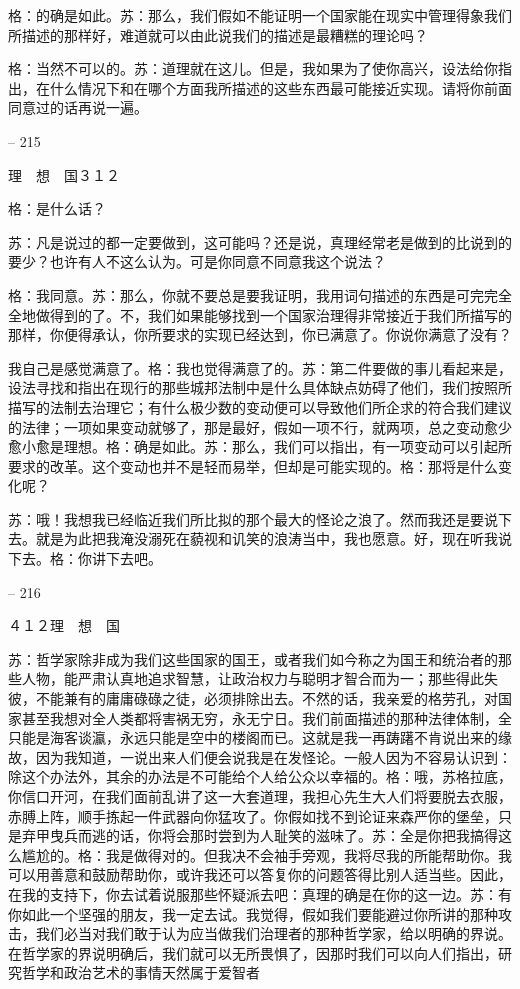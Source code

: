 \documentclass[11pt,oneside]{book}
\begin{document}
\begin{common-format}
    格：的确是如此。苏：那么，我们假如不能证明一个国家能在现实中管理得象我们所描述的那样好，难道就可以由此说我们的描述是最糟糕的理论吗？

    格：当然不可以的。苏：道理就在这儿。但是，我如果为了使你高兴，设法给你指出，在什么情况下和在哪个方面我所描述的这些东西最可能接近实现。请将你前面同意过的话再说一遍。

    

-- 215

    理　想　国３１２

    格：是什么话？

    苏：凡是说过的都一定要做到，这可能吗？还是说，真理经常老是做到的比说到的要少？也许有人不这么认为。可是你同意不同意我这个说法？

    格：我同意。苏：那么，你就不要总是要我证明，我用词句描述的东西是可完完全全地做得到的了。不，我们如果能够找到一个国家治理得非常接近于我们所描写的那样，你便得承认，你所要求的实现已经达到，你已满意了。你说你满意了没有？

    我自己是感觉满意了。格：我也觉得满意了的。苏：第二件要做的事儿看起来是，设法寻找和指出在现行的那些城邦法制中是什么具体缺点妨碍了他们，我们按照所描写的法制去治理它；有什么极少数的变动便可以导致他们所企求的符合我们建议的法律；一项如果变动就够了，那是最好，假如一项不行，就两项，总之变动愈少愈小愈是理想。格：确是如此。苏：那么，我们可以指出，有一项变动可以引起所要求的改革。这个变动也并不是轻而易举，但却是可能实现的。格：那将是什么变化呢？

    苏：哦！我想我已经临近我们所比拟的那个最大的怪论之浪了。然而我还是要说下去。就是为此把我淹没溺死在藐视和讥笑的浪涛当中，我也愿意。好，现在听我说下去。格：你讲下去吧。

    

-- 216

    ４１２理　想　国

    苏：哲学家除非成为我们这些国家的国王，或者我们如今称之为国王和统治者的那些人物，能严肃认真地追求智慧，让政治权力与聪明才智合而为一；那些得此失彼，不能兼有的庸庸碌碌之徒，必须排除出去。不然的话，我亲爱的格劳孔，对国家甚至我想对全人类都将害祸无穷，永无宁日。我们前面描述的那种法律体制，全只能是海客谈瀛，永远只能是空中的楼阁而已。这就是我一再踌躇不肯说出来的缘故，因为我知道，一说出来人们便会说我是在发怪论。一般人因为不容易认识到：除这个办法外，其余的办法是不可能给个人给公众以幸福的。格：哦，苏格拉底，你信口开河，在我们面前乱讲了这一大套道理，我担心先生大人们将要脱去衣服，赤膊上阵，顺手拣起一件武器向你猛攻了。你假如找不到论证来森严你的堡垒，只是弃甲曳兵而逃的话，你将会那时尝到为人耻笑的滋味了。苏：全是你把我搞得这么尴尬的。格：我是做得对的。但我决不会袖手旁观，我将尽我的所能帮助你。我可以用善意和鼓励帮助你，或许我还可以答复你的问题答得比别人适当些。因此，在我的支持下，你去试着说服那些怀疑派去吧：真理的确是在你的这一边。苏：有你如此一个坚强的朋友，我一定去试。我觉得，假如我们要能避过你所讲的那种攻击，我们必当对我们敢于认为应当做我们治理者的那种哲学家，给以明确的界说。在哲学家的界说明确后，我们就可以无所畏惧了，因那时我们可以向人们指出，研究哲学和政治艺术的事情天然属于爱智者


\end{common-format}
\end{document}
